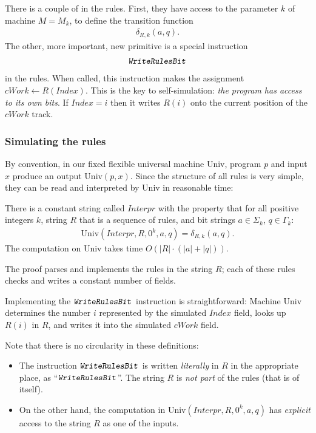 \documentclass[12pt]{memoir}
\newcommand{\fld}[1]{\ensuremath{\textit{#1}}}
\newcommand{\rul}[1]{\ensuremath{\texttt{\slshape #1\/}}}
\newcommand{\Index}{\fld{Index}}
\newcommand{\cWork}{\fld{cWork}}
\newcommand{\Interpr}{\mathit{Interpr}}
\newcommand{\Un}{\mathrm{Univ}}
\newcommand{\WriteRulesBit}{\rul{WriteRulesBit}}
\begin{document}
There is a couple of  in the rules.
First, they have access to the parameter \( k \) of machine \( M=M_{k} \), 
to define the transition function
 \begin{align*}
            \delta_{R,k}(a,q).
 \end{align*}
The other, more important, new primitive is a special instruction
 \begin{align*}
   \WriteRulesBit
 \end{align*}
in the rules.
When called, this instruction makes the assignment \( \cWork\gets R(\Index) \).
This is the key to self-simulation: \emph{the program has
access to its own bits}.
If \( \Index=i \) then it writes \( R(i) \) onto the current position of the \( \cWork \) track.


\subsubsection{Simulating the rules}

By convention, in our fixed flexible universal machine \( \Un \),
program \( p \) and input \( x \) produce an output \( \Un(p,x) \).
Since the structure of all rules is very simple, they can be read and
interpreted by \( \Un \) in reasonable time:

\begin{theorem}
There is a constant string called \( \Interpr \) with the property that for
all positive integers \( k \), string \( R \) that is a
sequence of rules, and bit strings \( a\in\Sigma_{k} \), \( q\in \Gamma_{k} \):
 \begin{align*}
  \Un(\Interpr,R,0^{k},a,q)=\delta_{R,k}(a,q).
 \end{align*}
The computation on \( \Un \) takes time \( O(|R|\cdot (|a|+|q|)) \).
\end{theorem}

The proof parses and implements the rules in the string \( R \); each of these rules
checks and writes a constant number of fields.

Implementing the \( \WriteRulesBit \) instruction is straightforward:
Machine \( \Un \) determines the number \( i \)
represented by the simulated \( \Index \) field, 
looks up \( R(i) \) in \( R \), and writes it into the simulated \( \cWork \) field.

Note that there is no circularity in these definitions:
  \begin{itemize}
  \item 
The instruction \( \WriteRulesBit \) is written \emph{literally}
in \( R \) in the appropriate place, as ``\(\WriteRulesBit \)''.
The string \( R \) is \emph{not part} of the rules (that is of itself).  
  \item On the other hand, the computation in
\( \Un(\Interpr,R,0^{k},a, q) \) 
has \emph{explicit} access to the string \( R \) as one of the inputs.
  \end{itemize}
\end{document}
